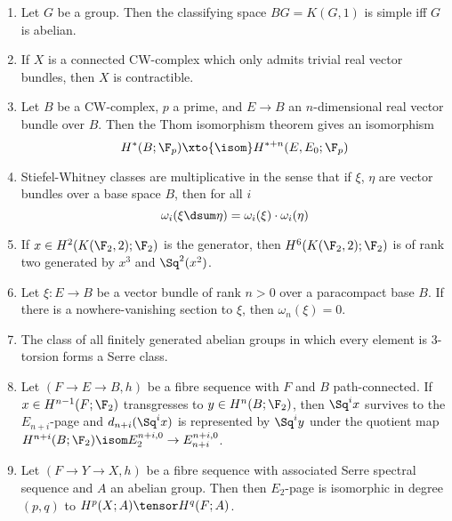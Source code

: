 \begin{questions*}
\begin{enumerate}
		\item Let $G$ be a group.
			Then the classifying space $BG = K(G, 1)$ is simple iff $G$ is abelian.
		\item If $X$ is a connected CW-complex which only admits trivial real vector bundles, then $X$ is contractible.
		\item Let $B$ be a CW-complex, $p$ a prime, and $E \to B$ an $n$-dimensional real vector bundle over $B$.
			Then the Thom isomorphism theorem gives an isomorphism
			\begin{equation*}
				H^*(B; \F_p) \xto{\isom} H^{* + n}(E, E_0; \F_p)
			\end{equation*}
		\item Stiefel-Whitney classes are multiplicative in the sense that if $\xi$, $\eta$ are vector bundles over a base space $B$, then for all $i$
			\begin{equation*}
				\omega_i(\xi \dsum \eta) = \omega_i(\xi) \cdot \omega_i(\eta)
			\end{equation*}
		\item If $x \in H^2(K(\F_2, 2); \F_2)$ is the generator, then $H^6(K(\F_2, 2); \F_2)$ is of rank two generated by $x^3$ and $\Sq^2(x^2)$.
		\item Let $\xi\colon E \to B$ be a vector bundle of rank $n > 0$ over a paracompact base $B$.
			If there is a nowhere-vanishing section to $\xi$, then $\omega_n(\xi) = 0$.
		\item The class of all finitely generated abelian groups in which every element is 3-torsion forms a Serre class.
		\item Let $(F \to E \to B, h)$ be a fibre sequence with $F$ and $B$ path-connected.
			If $x \in H^{n - 1}(F; \F_2)$ transgresses to $y \in H^n(B; \F_2)$, then $\Sq^i x$ survives to the $E_{n + i}$-page and $d_{n + i}(\Sq^i x)$ is represented by $\Sq^i y$ under the quotient map $H^{n + i}(B; \F_2) \isom E_2^{n + i, 0} \to E_{n + i}^{n + i, 0}$.
		\item Let $(F \to Y \to X, h)$ be a fibre sequence with associated Serre spectral sequence and $A$ an abelian group.
			Then then $E_2$-page is isomorphic in degree $(p, q)$ to $H^p(X; A) \tensor H^q(F; A)$.
	\end{enumerate}
\end{questions*}
